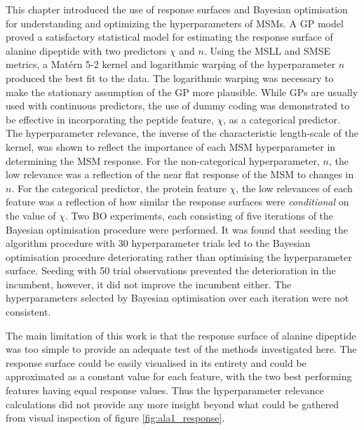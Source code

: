 This chapter introduced the use of response surfaces and Bayesian optimisation for understanding and optimizing the hyperparameters of MSMs. A GP model proved a satisfactory statistical model for estimating the response surface of alanine dipeptide with two predictors $\chi$ and $n$. Using the MSLL and SMSE metrics, a Mat\'{e}rn 5-2 kernel and logarithmic warping of the hyperparameter $n$ produced the best fit to the data.  The logarithmic warping was necessary to make the stationary assumption of the GP more plausible. While GPs are usually used with continuous predictors, the use of dummy coding  was demonstrated to be effective in incorporating the peptide feature, $\chi$, as a categorical predictor. The hyperparameter relevance, the inverse of the characteristic length-scale of the kernel,  was shown to reflect the importance of each  MSM hyperparameter in determining the MSM response. For the non-categorical hyperparameter, $n$, the low relevance was a reflection of the near flat response of the MSM to changes in $n$. For the categorical predictor, the protein feature $\chi$, the low relevances of each feature was a reflection of how similar the response surfaces were \emph{conditional} on the value of $\chi$.  Two BO experiments, each consisting of five iterations of the Bayesian optimisation procedure were performed. It was found that seeding the algorithm procedure with 30 hyperparameter trials led to the Bayesian optimisation procedure deteriorating rather than optimising the hyperparameter surface. Seeding with 50 trial observations prevented the deterioration in the incumbent, however, it did not improve the incumbent either. The hyperparameters selected by Bayesian optimisation over each iteration were not consistent. 

The main limitation of this work is that the response surface of alanine dipeptide  was too simple to provide an adequate test of the methods investigated here.  The response surface could be easily visualised in its entirety and could be approximated as a constant value for each feature, with the two best performing features having equal response values.  Thus the hyperparameter relevance calculations did not provide any more insight beyond what could be gathered from visual inspection of figure \ref{fig:ala1_response}.

